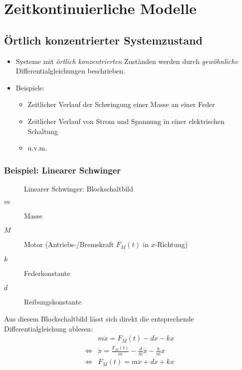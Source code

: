 \documentclass[a4paper, 11pt, accentcolor = tud3b]{tudreport}
\begin{document}
    \chapter{Zeitkontinuierliche Modelle} %
        \section{Örtlich konzentrierter Systemzustand} %
	        \begin{itemize}
	        	\item Systeme mit \textit{örtlich konzentrierten} Zuständen werden durch \textit{gewöhnliche} Differentialgleichungen beschrieben.
	        	\item Beispiele:
		        	\begin{itemize}
		        		\item Zeitlicher Verlauf der Schwingung einer Masse an einer Feder
		        		\item Zeitlicher Verlauf von Strom und Spannung in einer elektrischen Schaltung
		        		\item u.v.m.
		        	\end{itemize}
	        \end{itemize}

            \subsection{Beispiel: Linearer Schwinger} %
	            \begin{figure}[H]
	            	\centering
	            	
	            	\caption{Linearer Schwinger: Blockschaltbild}
	            \end{figure}
	            
	            \begin{description}
	            	\item[\(m\)] Masse
	            	\item[\(M\)] Motor (Antriebs-/Bremskraft \( F _ M (t) \) in \(x\)-Richtung)
	            	\item[\(k\)] Federkonstante
	            	\item[\(d\)] Reibungskonstante
	            \end{description}
	            
	            Aus diesem Blockschaltbild lässt sich direkt die entsprechende Differentialgleichung ablesen:
	            \begin{align*}
		                 & m\ddot{x} = F _ M (t) - d\dot{x} - kx \tag{Grundform} \\
		            \iff & \ddot{x} = \frac{F _ M (t)}{m} - \frac{d}{m} \dot{x} - \frac{k}{m} x \tag{Normalisiert} \\
		            \iff & F _ M (t) = m\ddot{x} + d\dot{x} + kx \tag{Motorkraft}
	            \end{align*}
	            
\end{document}
